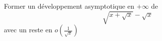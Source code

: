 Former un d\'eveloppement asymptotique en $+\infty$ de 
\[\sqrt{x+\sqrt{x}}-\sqrt{x}\]
avec un reste en $o(\frac{1}{\sqrt{x}})$\bigskip \bigskip